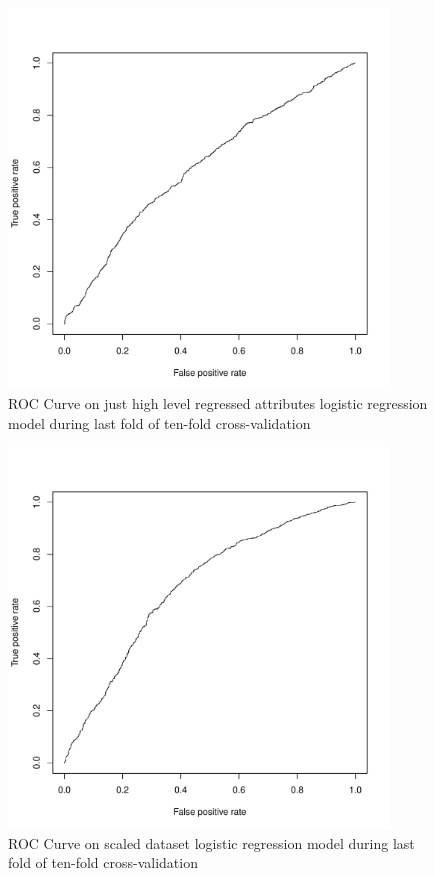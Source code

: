 \documentclass[11pt]{article}
\begin{document}
\begin{figure}[H]
  \centering
    \includegraphics[width=0.9\textwidth]{t3/roc_reg_hl}
    \caption{ROC Curve on just high level regressed attributes logistic regression model during last fold of ten-fold cross-validation}
    \label{fig:t3_roc_reg_hl}
\end{figure}
\begin{figure}[H]
  \centering
    \includegraphics[width=0.9\textwidth]{t3/roc_scaled}
    \caption{ROC Curve on scaled dataset logistic regression model during last fold of ten-fold cross-validation}
    \label{fig:t3_roc_scaled}
\end{figure}
\end{document}
